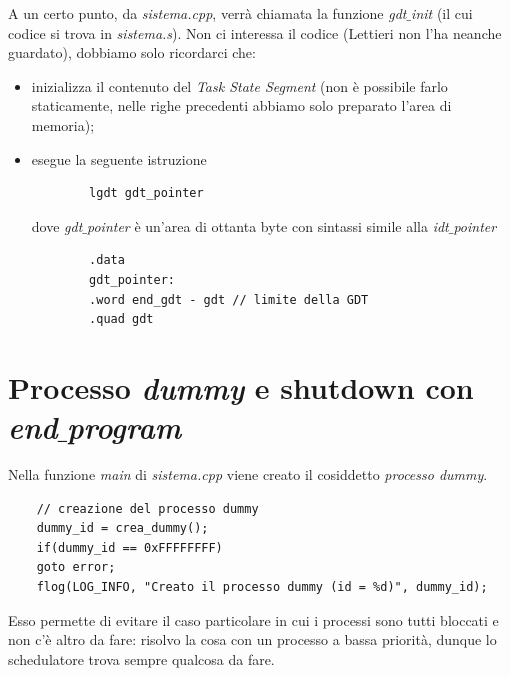 A un certo punto, da \emph{sistema.cpp}, verrà chiamata la funzione \emph{gdt$\_$init} (il cui codice si trova in \emph{sistema.s}). Non ci interessa il codice (Lettieri non l'ha neanche guardato), dobbiamo solo ricordarci che:
\begin{itemize}
	\item inizializza il contenuto del \emph{Task State Segment} (non è possibile farlo staticamente, nelle righe precedenti abbiamo solo preparato l'area di memoria);
	\item esegue la seguente istruzione
	\begin{verbatim}
		lgdt gdt_pointer
	\end{verbatim}
	dove \emph{gdt$\_$pointer} è un'area di ottanta byte con sintassi simile alla \emph{idt$\_$pointer}
	\begin{verbatim}
		.data
		gdt_pointer:
		.word end_gdt - gdt // limite della GDT
		.quad gdt
	\end{verbatim}
\end{itemize}
\small 
\normalsize 



\section{Processo \emph{dummy} e shutdown con \emph{end$\_$program}}
Nella funzione \emph{main} di \emph{sistema.cpp} viene creato il cosiddetto \emph{processo dummy}.
\small 
\begin{verbatim}
	// creazione del processo dummy
	dummy_id = crea_dummy();
	if(dummy_id == 0xFFFFFFFF)
	goto error;
	flog(LOG_INFO, "Creato il processo dummy (id = %d)", dummy_id);
\end{verbatim}
\normalsize 
Esso permette di evitare il caso particolare in cui i processi sono tutti bloccati e non c'è altro da fare: risolvo la cosa con un processo a bassa priorità, dunque lo schedulatore trova sempre qualcosa da fare.
